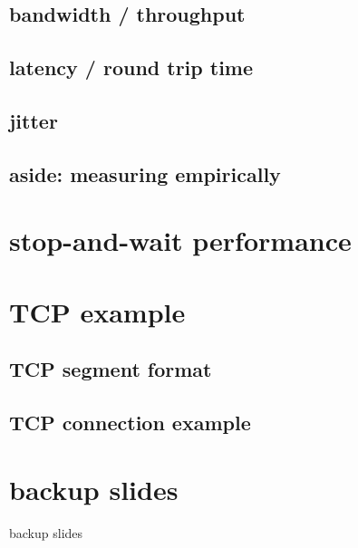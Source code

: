 \subsection{bandwidth / throughput}


\subsection{latency / round trip time}


\subsection{jitter}


\subsection{aside: measuring empirically}


\section{stop-and-wait performance}




\section{TCP example}

\subsection{TCP segment format}


%

\subsection{TCP connection example}




\section{backup slides}
\begin{frame}{backup slides}
\end{frame}


